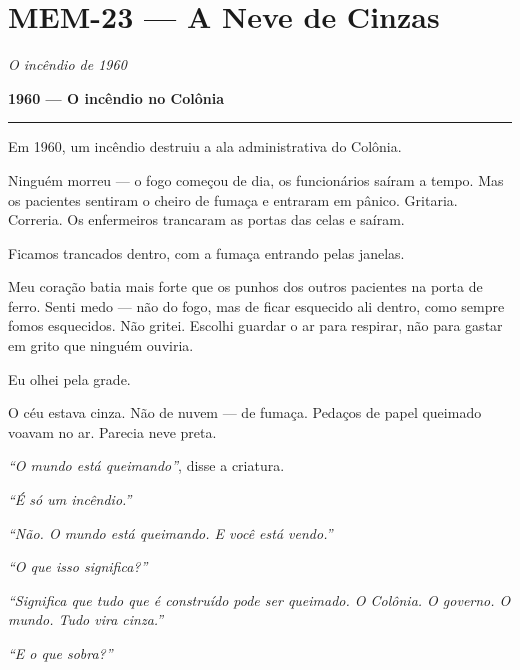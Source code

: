 \section*{\textbf{MEM-23} --- A Neve de Cinzas}

\noindent \textit{O incêndio de 1960}

\noindent \textbf{1960 --- O incêndio no Colônia}

\vspace{0.5em}\noindent\rule{\textwidth}{0.5pt}\vspace{0.5em}

\noindent Em 1960, um incêndio destruiu a ala administrativa do Colônia.

\noindent Ninguém morreu --- o fogo começou de dia, os funcionários saíram a tempo. Mas os pacientes sentiram o cheiro de fumaça e entraram em pânico. Gritaria. Correria. Os enfermeiros trancaram as portas das celas e saíram.

\noindent Ficamos trancados dentro, com a fumaça entrando pelas janelas.

\noindent Meu coração batia mais forte que os punhos dos outros pacientes na porta de ferro. Senti medo --- não do fogo, mas de ficar esquecido ali dentro, como sempre fomos esquecidos. Não gritei. Escolhi guardar o ar para respirar, não para gastar em grito que ninguém ouviria.

\noindent Eu olhei pela grade.

\noindent O céu estava cinza. Não de nuvem --- de fumaça. Pedaços de papel queimado voavam no ar. Parecia neve preta.

\noindent \textit{\textquotedblleft{}O mundo está queimando\textquotedblright{}}, disse a criatura.

\noindent \textit{\textquotedblleft{}É só um incêndio.\textquotedblright{}}

\noindent \textit{\textquotedblleft{}Não. O mundo está queimando. E você está vendo.\textquotedblright{}}

\noindent \textit{\textquotedblleft{}O que isso significa?\textquotedblright{}}

\noindent \textit{\textquotedblleft{}Significa que tudo que é construído pode ser queimado. O Colônia. O governo. O mundo. Tudo vira cinza.\textquotedblright{}}

\noindent \textit{\textquotedblleft{}E o que sobra?\textquotedblright{}}

